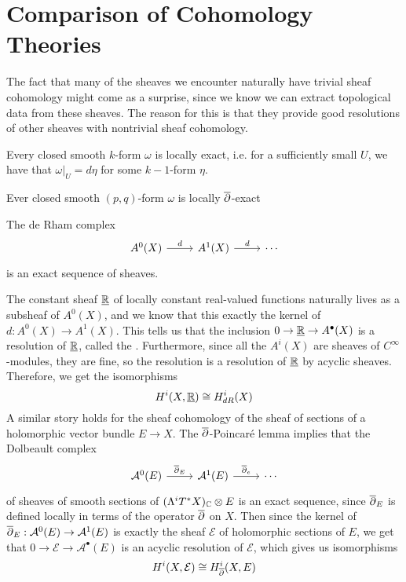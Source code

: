 \section{Comparison of Cohomology Theories}
%
The fact that many of the sheaves we encounter naturally have trivial sheaf cohomology
might come as a surprise, since we know we can extract topological data from
these sheaves. The reason for this is that they provide good resolutions of
other sheaves with nontrivial sheaf cohomology. 
%
\begin{prop}
Every closed smooth $k$-form $\omega$ is locally exact, i.e. for a sufficiently
small $U$, we have that $\omega\vert_U = d\eta$ for some $k-1$-form $\eta$.
\end{prop}
%
\begin{prop}
Ever closed smooth $(p,q)$-form $\omega$ is locally $\overline{\partial}$-exact
\end{prop}
%
\begin{cor}
The de Rham complex
\[\begin{tikzcd}
A^0(X) \ar[r, "d"] & A^1(X) \ar[r, "d"] & \cdots
\end{tikzcd}\]
is an exact sequence of sheaves.
\end{cor}
%
The constant sheaf $\underline{\mathbb{R}}$ of locally constant real-valued functions
naturally lives as a subsheaf of $A^0(X)$, and we know that this exactly
the kernel of $d : A^0(X) \to A^1(X)$. This tells us that the inclusion
$0 \to \underline{\mathbb{R}} \to A^\bullet(X)$ is a resolution of $\underline{\mathbb{R}}$,
called the . Furthermore,
since all the $A^i(X)$ are sheaves of $C^\infty$-modules, they are fine, so
the resolution is a resolution of $\underline{\mathbb{R}}$ by acyclic sheaves. Therefore,
we get the isomorphisms
\[
H^i(X, \underline{\mathbb{R}}) \cong H^i_{dR}(X)
\]
A similar story holds for the sheaf cohomology of the sheaf of sections of a holomorphic
vector bundle $E \to X$. The $\overline{\partial}$-Poincar\'e lemma implies that the Dolbeault
complex
\[\begin{tikzcd}
\mathcal{A}^0(E) \ar[r, "\dbar_E"] & \mathcal{A}^1(E) \ar[r, "\dbar_e"] & \cdots
\end{tikzcd}\]
of sheaves of smooth sections of $(\Lambda^i T^*X)_{\mathbb{C}} \otimes E$ is an exact sequence,
since $\overline{\partial}_E$ is defined locally in terms of the operator $\overline{\partial}$ on $X$.
Then since the kernel of $\overline{\partial}_E : \mathcal{A}^0(E) \to \mathcal{A}^1(E)$ is
exactly the sheaf $\mathcal{E}$ of holomorphic sections of $E$, we get that
$0 \to \mathcal{E} \to \mathcal{A}^\bullet(E)$ is an acyclic resolution of
$\mathcal{E}$, which gives us isomorphisms
\[
H^i(X,\mathcal{E}) \cong H^i_{\overline{\partial}}(X, E)
\]
%
%
%
%